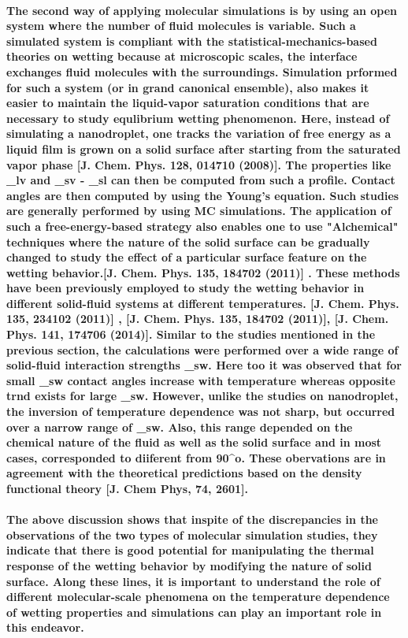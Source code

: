 \documentclass[a4paper,12pt,single,pdftex]{scrartcl}
\begin{document}
\label{ID_1217236864}\paragraph{The second way of applying molecular simulations is by using an open system where the number of fluid molecules is variable. Such a simulated system is compliant with the statistical-mechanics-based theories on wetting because at microscopic scales, the interface exchanges fluid molecules with the surroundings. Simulation prformed for such a system (or in grand canonical ensemble), also makes it easier to maintain the liquid-vapor saturation conditions that are necessary to study equlibrium wetting phenomenon. Here, instead of simulating a nanodroplet, one tracks the variation of free energy as a liquid film is grown on a solid surface after starting from the saturated vapor phase [J. Chem. Phys. 128, 014710 (2008)]. The properties like \gamma_{lv} and \gamma_{sv} - \gamma_{sl} can then be computed from such a profile. Contact angles are then computed by using the Young's equation. Such studies are generally performed by using MC simulations. The application of such a free-energy-based strategy also enables one to use "Alchemical" techniques where the nature of the solid surface can be gradually changed to study  the effect of a particular surface feature on the wetting behavior.[J. Chem. Phys. 135, 184702 (2011)] . These methods have been previously employed to study the wetting behavior in different solid-fluid systems at different temperatures. [J. Chem. Phys. 135, 234102 (2011)] , [J. Chem. Phys. 135, 184702 (2011)], [J. Chem. Phys. 141, 174706 (2014)]. Similar to the studies mentioned in the previous section, the calculations were performed over a wide range of solid-fluid interaction strengths \epsilon_{sw}. Here too it was observed that for small \epsilo_{sw} contact angles increase with temperature whereas opposite trnd exists for large \epsilon_{sw}. However, unlike the studies on nanodroplet, the inversion of temperature dependence was not sharp, but occurred over a narrow range of \epsilon_{sw}. Also, this range depended on the chemical nature of the fluid as well as the solid surface and in most cases, corresponded to \theta diiferent from 90^o. These obervations are in agreement with the theoretical predictions based on the density functional theory [J. Chem Phys, 74, 2601].}

\label{ID_862548497}\paragraph{The above discussion shows that inspite of the discrepancies in the observations of the two types of molecular simulation studies, they indicate that there is good potential for manipulating the thermal response of the wetting behavior by modifying the nature of solid surface. Along these lines, it is important to understand the role of different molecular-scale phenomena on the temperature dependence of wetting properties and simulations can play an important role in this endeavor.}
\end{document}
